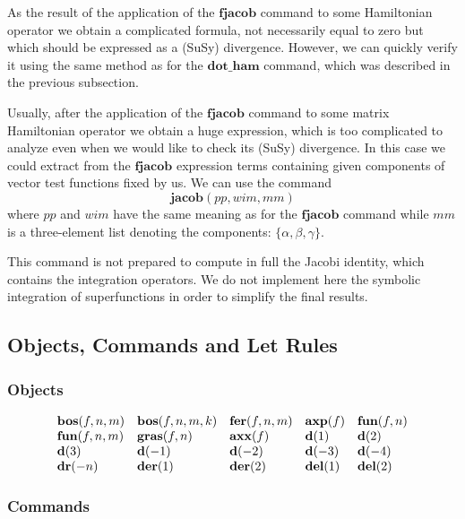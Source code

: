{As the result of the application of the $\mathbf{fjacob}$ command to
some Hamiltonian operator we obtain a complicated formula, not
necessarily equal to zero but which should be expressed as a (SuSy)
divergence.  However, we can quickly verify it using the same method
as for the $\mathbf{dot\_ham}$ command, which was described in the
previous subsection.

Usually, after the application of the $\mathbf{fjacob}$ command to
some matrix Hamiltonian operator we obtain a huge expression, which is
too complicated to analyze even when we would like to check its (SuSy)
divergence.  In this case we could extract from the $\mathbf{fjacob}$
expression terms containing given components of vector test functions
fixed by us.  We can use the command
\begin{equation*}
  \mathbf{jacob}(\mathit{pp}, \mathit{wim}, \mathit{mm})
\end{equation*}
where $\mathit{pp}$ and $\mathit{wim}$ have the same meaning as for
the $\mathbf{fjacob}$ command while $\mathit{mm}$ is a three-element
list denoting the components: $\{\alpha,\beta,\gamma\}$.

This command is not prepared to compute in full the Jacobi identity,
which contains the integration operators.  We do not implement here
the symbolic integration of superfunctions in order to simplify the
final results.

\subsection{Objects, Commands and Let Rules}

\subsubsection*{Objects}

\begin{equation*}
  \begin{array}{lllll}
    \mathbf{bos}(f,n,m) & \mathbf{bos}(f,n,m,k) & \mathbf{fer}(f,n,m) & \mathbf{axp}(f) & \mathbf{fun}(f,n) \\
    \mathbf{fun}(f,n,m) & \mathbf{gras}(f,n) & \mathbf{axx}(f) & \mathbf{d}(1) & \mathbf{d}(2) \\
    \mathbf{d}(3) & \mathbf{d}(-1) & \mathbf{d}(-2) & \mathbf{d}(-3) & \mathbf{d}(-4) \\
    \mathbf{dr}(-n) & \mathbf{der}(1) & \mathbf{der}(2) & \mathbf{del}(1) & \mathbf{del}(2)
  \end{array}
\end{equation*}

\subsubsection*{Commands}

}
